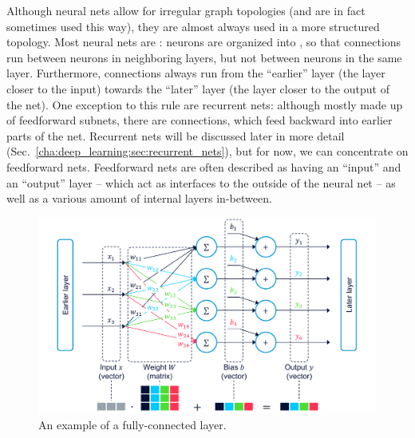 			Although neural nets allow for irregular graph topologies (and are in fact sometimes used this way), they are almost always used in a more structured topology.
			Most neural nets are : neurons are organized into , so that connections run between neurons in neighboring layers, but not between neurons in the same layer.
			Furthermore, connections always run from the ``earlier'' layer (the layer closer to the input) towards the ``later'' layer (the layer closer to the output of the net).
			One exception to this rule are recurrent nets: although mostly made up of feedforward subnets, there are  connections, which feed backward into earlier parts of the net.
			Recurrent nets will be discussed later in more detail (Sec.~\ref{cha:deep_learning:sec:recurrent_nets}), but for now, we can concentrate on feedforward nets.
			Feedforward nets are often described as having an ``input'' and an ``output'' layer -- which act as interfaces to the outside of the neural net -- as well as a various amount of  internal layers in-between.
			
			\begin{figure}[ht]
				\centering
				\includegraphics[width=\linewidth]{figures/02_deep_learning/fc_layer/fc_layer.pdf}
				\caption[Fully-connected layer]{An example of a fully-connected layer.}
				\label{fig:fc_layer}
			\end{figure}
			
